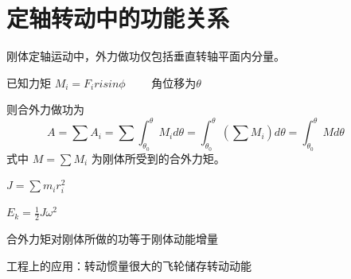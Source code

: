 
\section{定轴转动中的功能关系}

\begin{definition}[力矩的功]
	
刚体定轴运动中，外力做功仅包括垂直转轴平面内分量。

已知力矩 $M_i  = F_irisin\phi \qquad$  角位移为$ \theta \qquad$

则合外力做功为$$A = \sum A_i = \sum \int_{\theta_0}^{\theta} M_i d\theta = \int_{\theta_0}^{\theta}(\sum M_i)d\theta = \int_{\theta_0}^{\theta}Md\theta \qquad $$ 
式中 $M = \sum M_i$ 为刚体所受到的合外力矩。

\end{definition}

\begin{definition}[刚体转动惯量]
$J = \sum m_ir_i^2$
\end{definition}

\begin{definition}[刚体转动动能]
$E_k = \frac{1}{2} J \omega^2$
\end{definition}

\begin{definition}[刚体定轴转动动能定理]
合外力矩对刚体所做的功等于刚体动能增量
\end{definition}
\begin{supplement}
工程上的应用：转动惯量很大的飞轮储存转动动能
\end{supplement}

